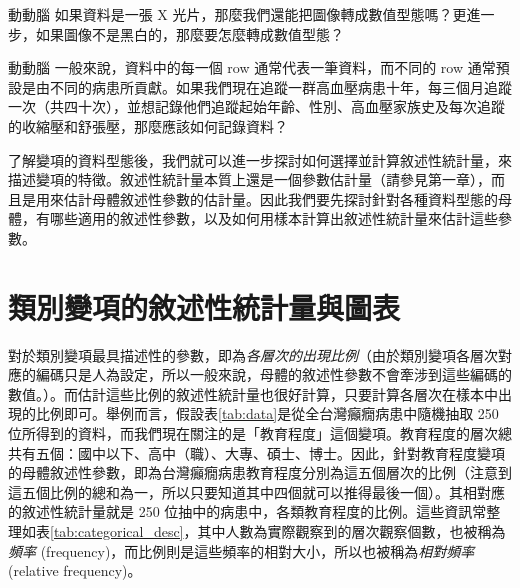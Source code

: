     \answerbox{120pt}

    \begin{custom}{動動腦}
        如果資料是一張 X 光片，那麼我們還能把圖像轉成數值型態嗎？更進一步，如果圖像不是黑白的，那麼要怎麼轉成數值型態？
    \end{custom}

    \answerbox{120pt}

    \begin{custom}{動動腦}
        一般來說，資料中的每一個 row 通常代表一筆資料，而不同的 row 通常預設是由不同的病患所貢獻。如果我們現在追蹤一群高血壓病患十年，每三個月追蹤一次（共四十次），並想記錄他們追蹤起始年齡、性別、高血壓家族史及每次追蹤的收縮壓和舒張壓，那麼應該如何記錄資料？
    \end{custom}

    \answerbox{180pt}

    了解變項的資料型態後，我們就可以進一步探討如何選擇並計算敘述性統計量，來描述變項的特徵。敘述性統計量本質上還是一個參數估計量（請參見第一章），而且是用來估計母體敘述性參數的估計量。因此我們要先探討針對各種資料型態的母體，有哪些適用的敘述性參數，以及如何用樣本計算出敘述性統計量來估計這些參數。
    
\section{類別變項的敘述性統計量與圖表}

    對於類別變項最具描述性的參數，即為\textit{各層次的出現比例}（由於類別變項各層次對應的編碼只是人為設定，所以一般來說，母體的敘述性參數不會牽涉到這些編碼的數值。）。而估計這些比例的敘述性統計量也很好計算，只要計算各層次在樣本中出現的比例即可。舉例而言，假設表\ref{tab:data}是從全台灣癲癇病患中隨機抽取 250 位所得到的資料，而我們現在關注的是「教育程度」這個變項。教育程度的層次總共有五個：國中以下、高中（職）、大專、碩士、博士。因此，針對教育程度變項的母體敘述性參數，即為台灣癲癇病患教育程度分別為這五個層次的比例（注意到這五個比例的總和為一，所以只要知道其中四個就可以推得最後一個）。其相對應的敘述性統計量就是 250 位抽中的病患中，各類教育程度的比例。這些資訊常整理如表\ref{tab:categorical_desc}，其中人數為實際觀察到的層次觀察個數，也被稱為\textit{頻率} (frequency)，而比例則是這些頻率的相對大小，所以也被稱為\textit{相對頻率} (relative frequency)。

